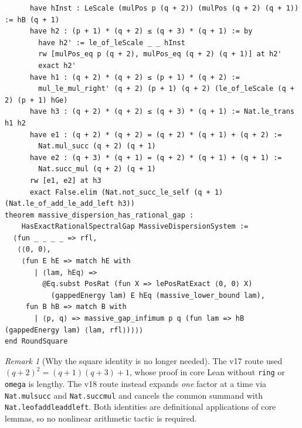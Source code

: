 \documentclass[11pt,a4paper]{article}
\theoremstyle{plain}
\theoremstyle{definition}
\theoremstyle{remark}
\newtheorem{remark}[theorem]{Remark}
\renewcommand{\_}{\oldunderscore\allowbreak}
\newcommand{\Lean}[1]{\texttt{\small #1}}
\begin{document}
\begin{lstlisting}
      have hInst : LeScale (mulPos p (q + 2)) (mulPos (q + 2) (q + 1)) := hB (q + 1)
      have h2 : (p + 1) * (q + 2) ≤ (q + 3) * (q + 1) := by
        have h2' := le_of_leScale _ _ hInst
        rw [mulPos_eq p (q + 2), mulPos_eq (q + 2) (q + 1)] at h2'
        exact h2'
      have h1 : (q + 2) * (q + 2) ≤ (p + 1) * (q + 2) :=
        mul_le_mul_right' (q + 2) (p + 1) (q + 2) (le_of_leScale (q + 2) (p + 1) hGe)
      have h3 : (q + 2) * (q + 2) ≤ (q + 3) * (q + 1) := Nat.le_trans h1 h2
      have e1 : (q + 2) * (q + 2) = (q + 2) * (q + 1) + (q + 2) :=
        Nat.mul_succ (q + 2) (q + 1)
      have e2 : (q + 3) * (q + 1) = (q + 2) * (q + 1) + (q + 1) :=
        Nat.succ_mul (q + 2) (q + 1)
      rw [e1, e2] at h3
      exact False.elim (Nat.not_succ_le_self (q + 1) (Nat.le_of_add_le_add_left h3))
theorem massive_dispersion_has_rational_gap :
    HasExactRationalSpectralGap MassiveDispersionSystem :=
  ⟨fun _ _ _ _ => rfl,
   ⟨⟨0, 0⟩,
    ⟨fun E hE => match hE with
       | ⟨lam, hEq⟩ =>
         @Eq.subst PosRat (fun X => lePosRatExact ⟨0, 0⟩ X)
           (gappedEnergy lam) E hEq (massive_lower_bound lam),
     fun B hB => match B with
       | ⟨p, q⟩ => massive_gap_infimum p q (fun lam => hB (gappedEnergy lam) ⟨lam, rfl⟩)⟩⟩⟩
end RoundSquare
\end{lstlisting}
\begin{remark}[Why the square identity is no longer needed]
The v17 route used $(q+2)^2=(q+1)(q+3)+1$, whose proof in core Lean without \texttt{ring} or
\texttt{omega} is lengthy. The v18 route instead expands \emph{one} factor at a time via
\Lean{Nat.mul\_succ} and \Lean{Nat.succ\_mul} and cancels the common summand with
\Lean{Nat.le\_of\_add\_le\_add\_left}. Both identities are definitional applications of core
lemmas, so no nonlinear arithmetic tactic is required.
\end{remark}
\end{document}

